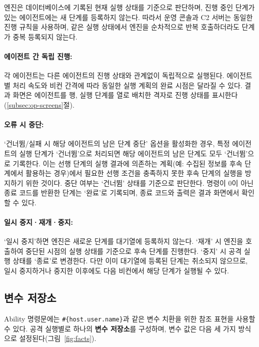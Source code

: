 엔진은 데이터베이스에 기록된 현재 실행 상태를 기준으로 판단하며, 진행 중인 단계가 있는 에이전트에는 새 단계를 등록하지 않는다.
따라서 운영 콘솔과 C2 서버는 동일한 진행 규칙을 사용하며, 같은 실행 상태에서 엔진을 순차적으로 반복 호출하더라도 단계가 중복 등록되지 않는다.

\paragraph{\textbf{에이전트 간 독립 진행:}}
각 에이전트는 다른 에이전트의 진행 상태와 관계없이 독립적으로 실행된다.
에이전트별 처리 속도와 비컨 간격에 따라 동일한 실행 계획의 완료 시점은 달라질 수 있다.
결과 화면은 에이전트를 행, 실행 단계를 열로 배치한 격자로 진행 상태를 표시한다(\ref{subsec:op-screens}절).

\paragraph{\textbf{오류 시 중단:}}
`건너뜀/실패 시 해당 에이전트의 남은 단계 중단' 옵션을 활성화한 경우, 특정 에이전트의 실행 단계가 `건너뜀'으로 처리되면 해당 에이전트의 남은 단계도 모두 `건너뜀'으로 기록한다.
이는 선행 단계의 실행 결과에 의존하는 계획(예: 수집된 정보를 후속 단계에서 활용하는 경우)에서 필요한 선행 조건을 충족하지 못한 후속 단계의 실행을 방지하기 위한 것이다.
중단 여부는 `건너뜀' 상태를 기준으로 판단한다. 명령이 0이 아닌 종료 코드를 반환한 단계는 `완료'로 기록되며, 종료 코드와 출력은 결과 화면에서 확인할 수 있다.

\paragraph{\textbf{일시 중지·재개·중지:}}
`일시 중지'하면 엔진은 새로운 단계를 대기열에 등록하지 않는다. `재개' 시 엔진을 호출하여 중단된 시점의 실행 상태를 기준으로 후속 단계를 진행한다.
`중지' 시 공격 실행 상태를 `종료'로 변경한다.
다만 이미 대기열에 등록된 단계는 취소되지 않으므로, 일시 중지하거나 중지한 이후에도 다음 비컨에서 해당 단계가 실행될 수 있다.

\subsection{변수 저장소}\label{subsec:facts}

Ability 명령문에는 \texttt{\#\{host.user.name\}}과 같은 변수 치환을 위한 참조 표현을 사용할 수 있다.
공격 실행별로 하나의 \textbf{변수 저장소}를 구성하며, 변수 값은 다음 세 가지 방식으로 설정된다(그림~\ref{fig:facts}).

